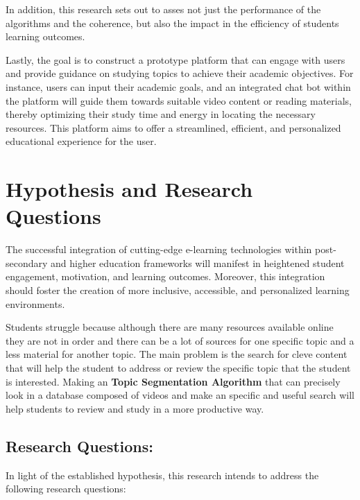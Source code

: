 In addition, this research sets out to asses not just the performance of the algorithms and the coherence, but also the impact in the efficiency of students learning outcomes.

Lastly, the goal is to construct a prototype platform that can engage with users and provide guidance on studying topics to achieve their academic objectives. For instance, users can input their academic goals, and an integrated chat bot within the platform will guide them towards suitable video content or reading materials, thereby optimizing their study time and energy in locating the necessary resources. This platform aims to offer a streamlined, efficient, and personalized educational experience for the user.





\section{Hypothesis and Research Questions}

The successful integration of cutting-edge e-learning technologies within post-secondary and higher education frameworks will manifest in heightened student engagement, motivation, and learning outcomes. Moreover, this integration should foster the creation of more inclusive, accessible, and personalized learning environments. 


Students struggle because although there are many resources available online they are not in order and there can be a lot of sources for one specific topic and a less material for another topic. The main problem is the search for cleve content that will help the student to address or review the specific topic that the student is interested.  Making an \textbf{Topic Segmentation Algorithm} that can precisely look in a database composed of videos and make an specific and useful search will help students to review and study in a more productive way.

\subsection{Research Questions:}
In light of the established hypothesis, this research intends to address the following research questions:


